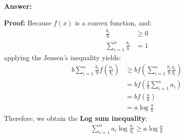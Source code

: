 \documentclass{article}
\newenvironment{QandA}{\begin{enumerate}[label=\arabic*.]}{\end{enumerate}}
\newenvironment{InnerQandA}{\begin{enumerate}[label=\roman*.]}{\end{enumerate}}
\newenvironment{answer}{\par\normalfont \textbf{Answer:}}{}
\newenvironment{proof}{\par\normalfont \textbf{Proof:}}{}
\begin{document}
\begin{QandA}
\begin{InnerQandA}
\begin{answer}
\begin{proof}
                Because $f(x)$ is a convex function, and:
                \begin{align*}
                    \frac{b_i}{b} &\ge 0 \\
                    \sum_{i=1}^n \frac{b_i}{b} &= 1
                \end{align*}
                applying the Jensen's inequality yields:
                \begin{align*}
                    b \sum_{i=1}^n \frac{b_i}{b} f \left( \frac{a_i}{b_i} \right) & \ge b f \left( \sum_{i=1}^n \frac{b_i}{b} \frac{a_i}{b_i} \right) \\
                    &= b f \left( \frac{1}{b} \sum_{i=1}^n a_i \right) \\
                    &= b f \left( \frac{a}{b} \right) \\
                    &= a \log \frac{a}{b}
                \end{align*}
                Therefore, we obtain the \textbf{Log sum inequality}:
                \begin{align*}
                    \sum_{i=1}^n a_i \log \frac{a_i}{b_i} \ge a \log \frac{a}{b}
                \end{align*}
            \end{proof}


\end{answer}
\end{InnerQandA}
\end{QandA}
\end{document}
